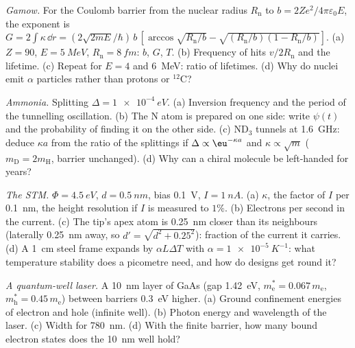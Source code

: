 \begin{exercise}[$\star\star$]\label{exo:b2:potential-wells-tunneling:9}
\emph{Gamow.} For the Coulomb barrier from the nuclear radius $R_{\text{n}}$
to $b = 2Ze^2/4\pi\varepsilon_0E$, the exponent is $G = 2\int\kappa\,\dd r =
(2\sqrt{2mE}/\hbar)\,b\,[\arccos\sqrt{R_{\text{n}}/b} - \sqrt{(R_{\text{n}}/b)(1 -
R_{\text{n}}/b)}]$. (a) $Z = 90$, $E = \qty{5}{MeV}$, $R_{\text{n}} = \qty{8}{fm}$:
$b$, $G$, $T$. (b) Frequency of hits $v/2R_{\text{n}}$ and the lifetime. (c)
Repeat for $E = 4$ and \qty{6}{MeV}: ratio of lifetimes. (d) Why do
nuclei emit $\alpha$ particles rather than protons or $^{12}$C?
\end{exercise}

\begin{exercise}[$\star\star\star$]\label{exo:b2:potential-wells-tunneling:10}
\emph{Ammonia.} Splitting $\Delta = \qty{1e-4}{eV}$. (a) Inversion frequency
and the period of the tunnelling oscillation. (b) The N atom is
prepared on one side: write $\psi(t)$ and the probability of finding it
on the other side. (c) ND$_3$ tunnels at \qty{1.6}{GHz}: deduce $\kappa a$
from the ratio of the splittings if $\Delta \propto \eu^{-\kappa a}$ and $\kappa
\propto\sqrt m$ ($m_{\text{D}} = 2m_{\text{H}}$, barrier unchanged). (d) Why can
a chiral molecule be left-handed for years?
\end{exercise}

\begin{exercise}[$\star\star\star$]\label{exo:b2:potential-wells-tunneling:11}
\emph{The STM.} $\Phi = \qty{4.5}{eV}$, $d = \qty{0.5}{nm}$, bias \qty{0.1}{V},
$I = \qty{1}{nA}$. (a) $\kappa$, the factor of $I$ per \qty{0.1}{nm}, the
height resolution if $I$ is measured to $1\%$. (b) Electrons per second
in the current. (c) The tip's apex atom is \qty{0.25}{nm} closer than its
neighbours (laterally \qty{0.25}{nm} away, so $d' = \sqrt{d^2 + 0.25^2}$):
fraction of the current it carries. (d) A \qty{1}{cm} steel frame expands
by $\alpha L\Delta T$ with $\alpha = \qty{1e-5}{K^{-1}}$: what temperature
stability does a picometre need, and how do designs get round it?
\end{exercise}

\begin{exercise}[$\star\star\star$]\label{exo:b2:potential-wells-tunneling:12}
\emph{A quantum-well laser.} A \qty{10}{nm} layer of GaAs (gap
\qty{1.42}{eV}, $m_{\text{e}}^* = 0.067\,m_{\text{e}}$, $m_{\text{h}}^* = 0.45\,m_{\text{e}}$)
between barriers \qty{0.3}{eV} higher. (a) Ground confinement energies
of electron and hole (infinite well). (b) Photon energy and wavelength
of the laser. (c) Width for \qty{780}{nm}. (d) With the finite barrier,
how many bound electron states does the \qty{10}{nm} well hold?
\end{exercise}

